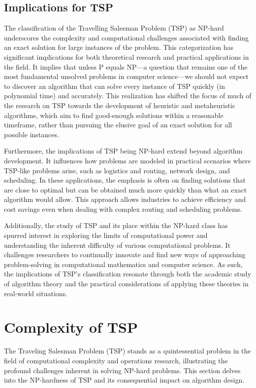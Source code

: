 \subsection{Implications for TSP}

The classification of the Travelling Salesman Problem (TSP) as NP-hard underscores the complexity and computational challenges associated with finding an exact solution for large instances of the problem. This categorization has significant implications for both theoretical research and practical applications in the field. It implies that unless P equals NP—a question that remains one of the most fundamental unsolved problems in computer science—we should not expect to discover an algorithm that can solve every instance of TSP quickly (in polynomial time) and accurately. This realization has shifted the focus of much of the research on TSP towards the development of heuristic and metaheuristic algorithms, which aim to find good-enough solutions within a reasonable timeframe, rather than pursuing the elusive goal of an exact solution for all possible instances.

Furthermore, the implications of TSP being NP-hard extend beyond algorithm development. It influences how problems are modeled in practical scenarios where TSP-like problems arise, such as logistics and routing, network design, and scheduling. In these applications, the emphasis is often on finding solutions that are close to optimal but can be obtained much more quickly than what an exact algorithm would allow. This approach allows industries to achieve efficiency and cost savings even when dealing with complex routing and scheduling problems.

Additionally, the study of TSP and its place within the NP-hard class has spurred interest in exploring the limits of computational power and understanding the inherent difficulty of various computational problems. It challenges researchers to continually innovate and find new ways of approaching problem-solving in computational mathematics and computer science. As such, the implications of TSP's classification resonate through both the academic study of algorithm theory and the practical considerations of applying these theories in real-world situations.


\section{Complexity of TSP}

The Traveling Salesman Problem (TSP) stands as a quintessential problem in the field of computational complexity and operations research, illustrating the profound challenges inherent in solving NP-hard problems. This section delves into the NP-hardness of TSP and its consequential impact on algorithm design.

